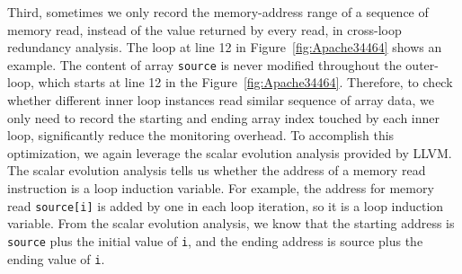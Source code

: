 

Third, sometimes we only record the memory-address range of a sequence of memory
read, instead of the value returned by every read, in cross-loop redundancy
analysis. 
The loop at line 12 in Figure~\ref{fig:Apache34464} shows an example.
The content of array \texttt{source} is never modified
throughout the outer-loop, which starts 
at line 12 in the Figure~\ref{fig:Apache34464}.
Therefore, to check whether different inner loop instances read similar
sequence of array data, we only need to record the starting and 
ending array index touched by each inner loop, significantly reduce the 
monitoring overhead. To accomplish this optimization, we again leverage
the scalar evolution analysis provided by LLVM. The scalar evolution analysis
tells us whether the address of a memory read instruction
is a loop induction variable. For example, the address for memory read \texttt{source[i]} is added by one in each loop iteration,
so it is a loop induction variable. 
From the scalar evolution analysis, we know that the starting address is \texttt{source} plus the initial value of \texttt{i}, and the ending address
is source plus the ending value of \texttt{i}.  

